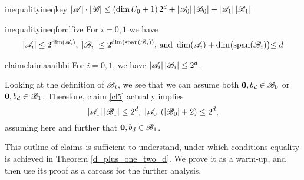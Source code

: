 \begin{restatable}{inequality}{ineqkey}\label{in1}
    $\left|{\mathscr{A}}\right| \cdot\left|{\mathscr{B}}\right| \leq \left(\operatorname{dim} U_0+1\right) 2^d+\left|{\mathscr{A}}_0\right|\left|{\mathscr{B}}_0\right|+\left|{\mathscr{A}}_1\right|\left|{\mathscr{B}}_1\right|$
\end{restatable}

\begin{restatable}{inequality}{ineqforclfive}\label{ineqForCl5}
    For $i = 0,1$ we have 
    \[
        |{\mathscr{A}}_i| \leq 2^{\operatorname{dim}({\mathscr{A}}_i)},\;|{\mathscr{B}}_i| \leq 2^{\operatorname{dim}(\operatorname{span}({\mathscr{B}}_i))} \text{, and } \operatorname{dim}({\mathscr{A}}_i) + \operatorname{dim}\bigl(\operatorname{span}({\mathscr{B}}_i)\bigl) \leq d
    \]
\end{restatable}

\begin{restatable}{claim}{claimaaaibbi}\label{cl5}
    For $i=0, 1$, we have $\left|{\mathscr{A}}_i\right|\left|{\mathscr{B}}_i\right| \leq 2^d$.
\end{restatable}


\noindent Looking at the definition of ${\mathscr{B}}_i$, we see that we can assume both  $\mathbf{0}, b_d \in {\mathscr{B}}_0$ or $\mathbf{0}, b_d \in {\mathscr{B}}_1$. Therefore, claim \ref{cl5} actually implies
\begin{equation}\label{stronger5}
    \left|{\mathscr{A}}_1\right|\left|{\mathscr{B}}_1\right| \leq 2^d,\; \left|{\mathscr{A}}_0\right|\left(\left|{\mathscr{B}}_0\right|+2\right)\leq 2^d,
\end{equation}
assuming here and further that $\mathbf{0}, b_d \in {\mathscr{B}}_1$.

\noindent This outline of claims is sufficient to  understand, under which conditions equality is achieved in Theorem \ref{d_plus_one_two_d}. We prove it as a warm-up, and then use its proof as a carcass for the further analysis.

